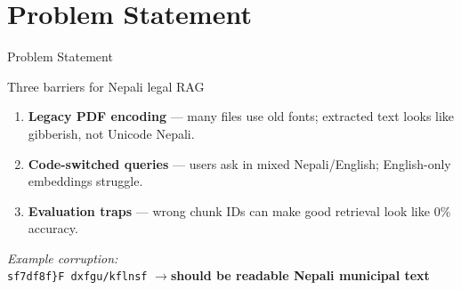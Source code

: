 \documentclass[11pt,aspectratio=169]{beamer}
\begin{document}
\section{Problem Statement}
\begin{frame}{Problem Statement}
  \begin{alertblock}{Three barriers for Nepali legal RAG}
    \begin{enumerate}
      \item \textbf{Legacy PDF encoding} — many files use old fonts; extracted text looks like gibberish, not Unicode Nepali.
      \item \textbf{Code-switched queries} — users ask in mixed Nepali/English; English-only embeddings struggle.
      \item \textbf{Evaluation traps} — wrong chunk IDs can make good retrieval look like 0\% accuracy.
    \end{enumerate}
  \end{alertblock}
  \vspace{0.2cm}
  \centering
  \small\textit{Example corruption:}\\
  \texttt{sf7df8f\}F dxfgu/kflnsf} \quad$\rightarrow$\quad \textbf{should be readable Nepali municipal text}
\end{frame}

\end{document}
